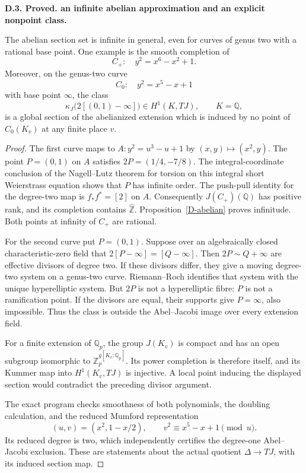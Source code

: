 \documentclass[11pt,oneside]{article}
\makeatletter
\newcounter{statementanchor}
\newenvironment{statement}[3]{%
 \refstepcounter{statementanchor}\def\@currentlabel{#1}%
 \par\addvspace{9pt}\noindent
 \textbf{#1. #2. #3.}\par\nobreak\noindent\ignorespaces
}{\par\addvspace{5pt}}
\makeatother
\begin{document}
\begin{statement}{D.3}{Proved}{an infinite abelian approximation and an explicit nonpoint class}
\label{st:D.3}
\label{D-abelian-examples}
The abelian section set is infinite in general,
even for curves of genus two with a rational base point.
One example is the smooth completion of
\[
 C_+:\quad y^2=x^6-x^2+1.
\]
Moreover, on the genus-two curve
\[
 C_0:\quad y^2=x^5-x+1
\]
with base point $\infty$, the class
\[
 \kappa_J\bigl(2[(0,1)-\infty]\bigr)
 \in H^1(K,TJ),\qquad K=\mathbb Q,
\]
is a global section of the abelianized extension which
is induced by no point of $C_0(K_v)$ at any finite place
$v$.
\end{statement}
\begin{proof}
The first curve maps to $A:y^2=u^3-u+1$ by
$(x,y)\mapsto(x^2,y)$. The point $P=(0,1)$ on $A$
satisfies $2P=(1/4,-7/8)$. The integral-coordinate
conclusion of the Nagell--Lutz theorem for torsion
on this integral short Weierstrass equation shows
that $P$ has infinite order. The push-pull identity
for the degree-two map is $f_*f^*=[2]$ on $A$.
Consequently $J(C_+)(\mathbb Q)$ has positive rank,
and its completion contains $\widehat{\mathbb Z}$.
Proposition~\ref{D-abelian} proves infinitude.
Both points at infinity of $C_+$ are rational.

For the second curve put $P=(0,1)$. Suppose over
an algebraically closed characteristic-zero field
that $2[P-\infty]=[Q-\infty]$. Then
$2P\sim Q+\infty$ are effective divisors of degree
two. If these divisors differ, they give a moving
degree-two system on a genus-two curve. Riemann--Roch
identifies that system with the unique hyperelliptic
system. But $2P$ is not a hyperelliptic fibre:
$P$ is not a ramification point. If the divisors
are equal, their supports give $P=\infty$, also
impossible. Thus the class is outside the
Abel--Jacobi image over every extension field.

For a finite extension of $\mathbb Q_p$, the group
$J(K_v)$ is compact and has an open subgroup
isomorphic to $\mathbb Z_p^{g[K_v:\mathbb Q_p]}$.
Its power completion is therefore itself, and
its Kummer map into $H^1(K_v,TJ)$ is injective.
A local point inducing the displayed section
would contradict the preceding divisor argument.

The exact program checks smoothness of both
polynomials, the doubling calculation, and the
reduced Mumford representation
\[
 (u,v)=(x^2,1-x/2),\qquad v^2\equiv x^5-x+1\pmod u .
\]
Its reduced degree is two, which independently
certifies the degree-one Abel--Jacobi exclusion.
These are statements about the actual quotient
$\Delta\to TJ$, with its induced section map.
\end{proof}
\end{document}
